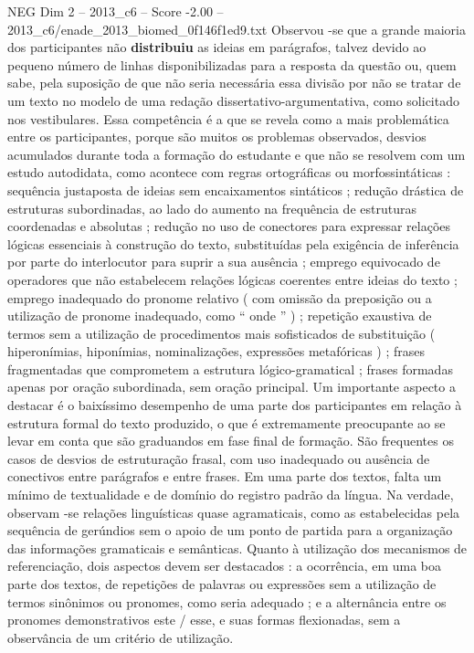 \begin{textsample}{NEG Dim 2 – 2013\_c6 – Score -2.00 – 2013\_c6/enade\_2013\_biomed\_0f146f1ed9.txt}
Observou -se que a grande maioria dos participantes não \textbf{distribuiu} as ideias em parágrafos, talvez devido ao pequeno número de linhas disponibilizadas para a resposta da questão ou, quem sabe, pela suposição de que não seria necessária essa divisão por não se tratar de um texto no modelo de uma redação dissertativo-argumentativa, como solicitado nos vestibulares.
Essa competência é a que se revela como a mais problemática entre os participantes, porque são muitos os problemas observados, desvios acumulados durante toda a formação do estudante e que não se resolvem com um estudo autodidata, como acontece com regras ortográficas ou morfossintáticas : sequência justaposta de ideias sem encaixamentos sintáticos ; redução drástica de estruturas subordinadas, ao lado do aumento na frequência de estruturas coordenadas e absolutas ; redução no uso de conectores para expressar relações lógicas essenciais à construção do texto, substituídas pela exigência de inferência por parte do interlocutor para suprir a sua ausência ; emprego equivocado de operadores que não estabelecem relações lógicas coerentes entre ideias do texto ; emprego inadequado do pronome relativo ( com omissão da preposição ou a utilização de pronome inadequado, como “ onde ” ) ; repetição exaustiva de termos sem a utilização de procedimentos mais sofisticados de substituição ( hiperonímias, hiponímias, nominalizações, expressões metafóricas ) ; frases fragmentadas que comprometem a estrutura lógico-gramatical ; frases formadas apenas por oração subordinada, sem oração principal.
Um importante aspecto a destacar é o baixíssimo desempenho de uma parte dos participantes em relação à estrutura formal do texto produzido, o que é extremamente preocupante ao se levar em conta que são graduandos em fase final de formação.
São frequentes os casos de desvios de estruturação frasal, com uso inadequado ou ausência de conectivos entre parágrafos e entre frases.
Em uma parte dos textos, falta um mínimo de textualidade e de domínio do registro padrão da língua.
Na verdade, observam -se relações linguísticas quase agramaticais, como as estabelecidas pela sequência de gerúndios sem o apoio de um ponto de partida para a organização das informações gramaticais e semânticas.
Quanto à utilização dos mecanismos de referenciação, dois aspectos devem ser destacados : a ocorrência, em uma boa parte dos textos, de repetições de palavras ou expressões sem a utilização de termos sinônimos ou pronomes, como seria adequado ; e a alternância entre os pronomes demonstrativos este / esse, e suas formas flexionadas, sem a observância de um critério de utilização.

\end{textsample}
